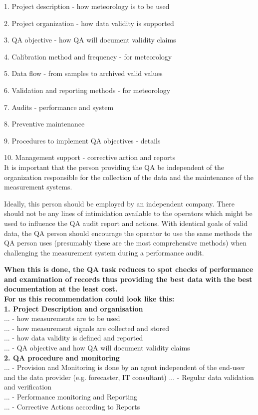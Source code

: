 {{1.  Project description - how meteorology is to be used 

2.  Project organization - how data validity is supported 

3.  QA objective - how QA will document validity claims 

4.  Calibration method and frequency - for meteorology 

5.  Data flow - from samples to archived valid values 

6.  Validation and reporting methods - for meteorology 

7.  Audits - performance and system 

8.  Preventive maintenance 

9.  Procedures to implement QA objectives - details

10.  Management support - corrective action and reports \\

It is important that the person providing the QA be independent of the organization responsible for the collection of the data and the maintenance of the measurement systems. 

Ideally, this person should be employed by an independent company.  There should not be any lines of intimidation available to the operators which might be used to influence the QA audit report and actions.  With identical goals of valid data, the QA person should encourage the operator to use the same methods the QA person uses (presumably these are the most comprehensive methods) when challenging the measurement system during a performance audit. 

\textbf{When this is done, the QA task reduces to spot checks of performance and examination of records thus providing the best data with the best documentation at the least cost.}\\


\textbf{For us this recommendation could look like this:} \\
\textbf{1. Project Description and organisation}\\
...    - how measurements are to be used\\
...    - how measurement signals are collected and stored\\
...    - how data validity is defined and reported\\
...    - QA objective and how QA will document validity claims\\
    
\textbf{2. QA procedure and monitoring} \\
...    - Provision and Monitoring is done by an agent independent of the end-user and the data provider (e.g. forecaster, IT consultant)
...    - Regular data validation and verification \\
...    - Performance monitoring and Reporting\\
...    - Corrective Actions according to Reports\\




}}

